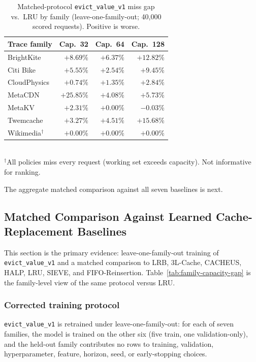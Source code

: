 \documentclass[preprint,12pt]{elsarticle}
\begin{document}
\begin{table}[!htbp]
\centering
\caption{Matched-protocol \texttt{evict\_value\_v1} miss gap vs.\ LRU by family (leave-one-family-out; 40{,}000 scored requests). Positive is worse.}
\label{tab:family-capacity-gap}
\label{subsec:end_to_end_capacities}
\renewcommand{\arraystretch}{1.15}
\small
\begin{tabular}{l r r r}
\toprule
Trace family & Cap.\ 32 & Cap.\ 64 & Cap.\ 128 \\
\midrule
BrightKite    & $+8.69\%$  & $+6.37\%$  & $+12.82\%$ \\
Citi Bike     & $+5.55\%$  & $+2.54\%$  & $+9.45\%$ \\
CloudPhysics  & $+0.74\%$  & $+1.35\%$  & $+2.84\%$ \\
MetaCDN       & $+25.85\%$ & $+4.08\%$  & $+5.73\%$ \\
MetaKV        & $+2.31\%$  & $+0.00\%$  & $-0.03\%$ \\
Twemcache     & $+3.27\%$  & $+4.51\%$  & $+15.68\%$ \\
Wikimedia$^\dagger$ & $+0.00\%$  & $+0.00\%$  & $+0.00\%$ \\
\bottomrule
\end{tabular}
\\[3pt]
\footnotesize $^\dagger$All policies miss every request (working set exceeds capacity). Not informative for ranking.
\end{table}

The aggregate matched comparison against all seven baselines is next.

\subsection{Matched Comparison Against Learned Cache-Replacement Baselines}
\label{subsec:major1_comparison}

This section is the primary evidence: leave-one-family-out training of \texttt{evict\_value\_v1} and a matched comparison to LRB, 3L-Cache, CACHEUS, HALP, LRU, SIEVE, and FIFO-Reinsertion. Table~\ref{tab:family-capacity-gap} is the family-level view of the same protocol versus LRU.

\subsubsection{Corrected training protocol}

\texttt{evict\_value\_v1} is retrained under leave-one-family-out: for each of seven families, the model is trained on the other six (five train, one validation-only), and the held-out family contributes no rows to training, validation, hyperparameter, feature, horizon, seed, or early-stopping choices.
\end{document}
